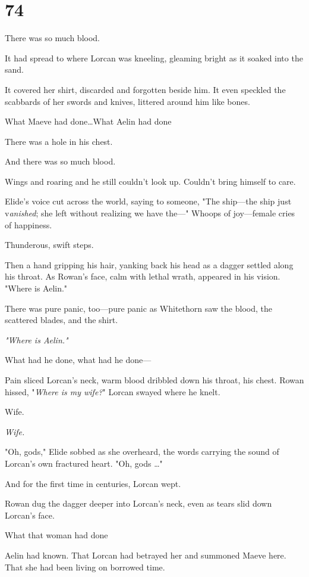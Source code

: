
\chapter{74}

There was so much blood.

It had spread to where Lorcan was kneeling, gleaming bright as it soaked into the sand.

It covered her shirt, discarded and forgotten beside him.
It even speckled the scabbards of her swords and knives, littered around him like bones.

What Maeve had done\ldots What Aelin had done 

There was a hole in his chest.

And there was so much blood.

Wings and roaring and he still couldn't look up.
Couldn't bring himself to care.

Elide's voice cut across the world, saying to someone, "The ship---the ship just v\emph{anished}; she left without realizing we have the---" Whoops of joy---female cries of happiness.

Thunderous, swift steps.

Then a hand gripping his hair, yanking back his head as a dagger settled along his throat.
As Rowan's face, calm with lethal wrath, appeared in his vision.
"Where is Aelin."

There was pure panic, too---pure panic as Whitethorn saw the blood, the scattered blades, and the shirt.

\emph{"Where is Aelin."}

What had he done, what had he done---

Pain sliced Lorcan's neck, warm blood dribbled down his throat, his chest.
Rowan hissed, "\emph{Where is my wife?}" Lorcan swayed where he knelt.

Wife.

\emph{Wife.}

"Oh, gods," Elide sobbed as she overheard, the words carrying the sound of Lorcan's own fractured heart.
"Oh, gods \ldots"

And for the first time in centuries, Lorcan wept.

Rowan dug the dagger deeper into Lorcan's neck, even as tears slid down Lorcan's face.

What that woman had done 

Aelin had known.
That Lorcan had betrayed her and summoned Maeve here.
That she had been living on borrowed time.

